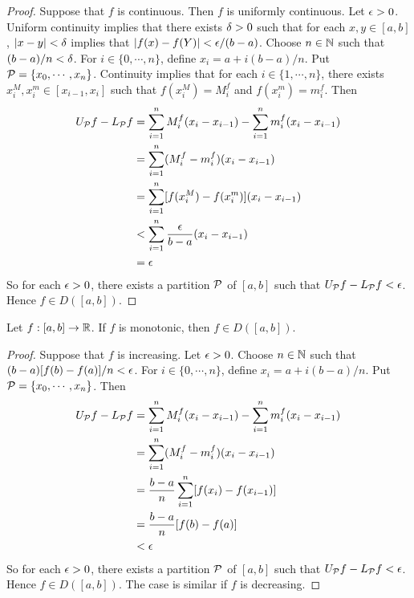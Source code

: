 \documentclass{book}
\begin{document}
	\begin{proof}
		Suppose that $f$ is continuous. Then $f$ is uniformly continuous. Let $\epsilon >0$. Uniform continuity implies that there exists $\delta > 0$ such that for each $x, y \in [a,b]$, $|x-y| < \delta$ implies that $|f(x) - f(Y)| < \epsilon/(b-a)$. Choose $n \in \mathbb{N}$ such that $(b-a)/n < \delta$. For $i \in \{0, \cdots, n\}$, define $x_i = a + i(b-a)/n$. Put $\mathcal{P} = \{x_0, \cdots, x_n\}$. Continuity implies that for each $i \in \{1, \cdots, n\}$, there exists $x_i^M, x_i^m \in [x_{i-1}, x_i]$ such that $f(x_i^M) = M_i^f$ and $f(x_i^m) = m_i^f$. Then 
		\begin{align*}
			U_{\mathcal{P}} f - L_{\mathcal{P}} f 
			&= \sum_{i=1}^n M^f_i(x_i - x_{i-1}) - \sum_{i=1}^n m^f_i(x_i - x_{i-1}) \\
			&= \sum_{i=1}^n (M^f_i - m^f_i)(x_i - x_{i-1}) \\
			&= \sum_{i=1}^n [f(x_i^M) - f(x_i^m)](x_i - x_{i-1}) \\
			& < \sum_{i=1}^n \frac{\epsilon}{b-a}(x_i - x_{i-1}) \\
			&= \epsilon 
		\end{align*}
		So for each $\epsilon >0$, there exists a partition $\mathcal{P}$ of $[a,b]$ such that $U_{\mathcal{P}} f - L_{\mathcal{P}} f < \epsilon$. Hence $f \in D([a,b])$.
	\end{proof}

	\begin{ex}  
		Let $f:[a,b] \rightarrow \mathbb{R}$. If $f$ is monotonic, then $f \in D([a,b])$.
	\end{ex}

	\begin{proof}
		Suppose that $f$ is increasing. Let $\epsilon >0$. Choose $n \in \mathbb{N}$ such that $(b-a)[f(b) - f(a)] /n < \epsilon $. For $i \in \{0, \cdots, n\}$, define $x_i = a + i(b-a)/n$. Put $\mathcal{P} = \{x_0, \cdots, x_n\}$. Then 
		\begin{align*}
			U_{\mathcal{P}} f - L_{\mathcal{P}} f 
			&= \sum_{i=1}^n M^f_i(x_i - x_{i-1}) - \sum_{i=1}^n m^f_i(x_i - x_{i-1}) \\
			&= \sum_{i=1}^n (M^f_i - m^f_i)(x_i - x_{i-1}) \\
			&= \frac{b-a}{n} \sum_{i=1}^n [f(x_i) - f(x_{i-1})]  \\
			&= \frac{b-a}{n} [f(b) - f(a)] \\
			& < \epsilon
		\end{align*}
	So for each $\epsilon >0$, there exists a partition $\mathcal{P}$ of $[a,b]$ such that $U_{\mathcal{P}} f - L_{\mathcal{P}} f < \epsilon$. Hence $f \in D([a,b])$. The case is similar if $f$ is decreasing. 
	\end{proof}
\end{document}
